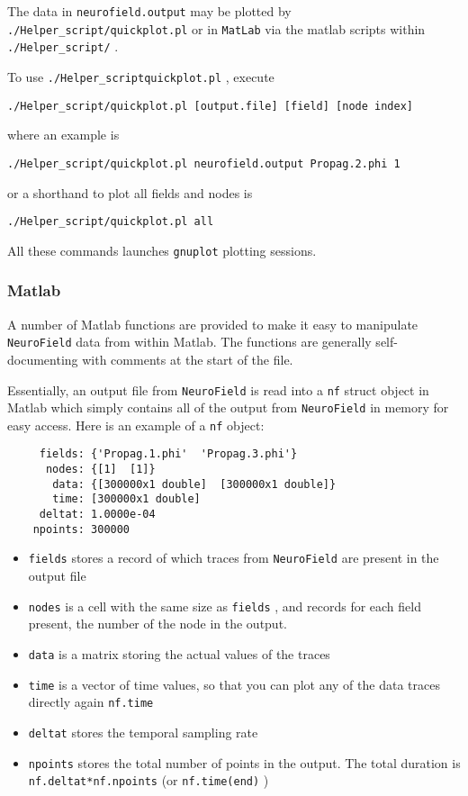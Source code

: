 \documentclass[12pt,a4paper]{article}
\newcommand{\type}[1]{ {\small\small\tt #1} }
\newcommand{\NF}[0]{ \type{NeuroField}}
\begin{document}
The data in \type{neurofield.output} may be plotted by \type{./Helper\_script/quickplot.pl} or in \type{MatLab} via the matlab scripts within \type{./Helper\_script/}.

To use \type{./Helper\_script\/quickplot.pl}, execute
\begin{lstlisting}
./Helper_script/quickplot.pl [output.file] [field] [node index]
\end{lstlisting}
where an example is
\begin{lstlisting}
./Helper_script/quickplot.pl neurofield.output Propag.2.phi 1
\end{lstlisting}
or a shorthand to plot all fields and nodes is
\begin{lstlisting}
./Helper_script/quickplot.pl all
\end{lstlisting}
All these commands launches \type{gnuplot} plotting sessions.

\subsubsection{Matlab}
A number of Matlab functions are provided to make it easy to manipulate \NF data from within Matlab. The functions are generally self-documenting with comments at the start of the file.

Essentially, an output file from \NF is read into a \type{nf} struct object in Matlab which simply contains all of the output from \NF in memory for easy access. Here is an example of a \type{nf} object:
\begin{lstlisting}
     fields: {'Propag.1.phi'  'Propag.3.phi'}
      nodes: {[1]  [1]}
       data: {[300000x1 double]  [300000x1 double]}
       time: [300000x1 double]
     deltat: 1.0000e-04
    npoints: 300000
\end{lstlisting}
\begin{itemize}
\item \type{fields} stores a record of which traces from \NF are present in the output file
\item \type{nodes} is a cell with the same size as \type{fields}, and records for each field present, the number of the node in the output. 
\item \type{data} is a matrix storing the actual values of the traces
\item \type{time} is a vector of time values, so that you can plot any of the data traces directly again \type{nf.time}
\item \type{deltat} stores the temporal sampling rate
\item \type{npoints} stores the total number of points in the output. The total duration is \type{nf.deltat*nf.npoints} (or  \type{nf.time(end)})
\end{itemize}
\end{document}
